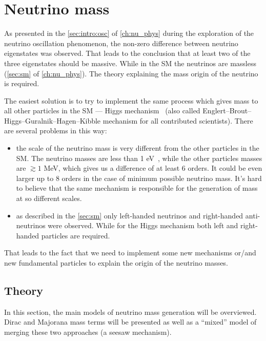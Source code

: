 \documentclass[../main.tex]{subfiles}
\begin{document}
\chapter{Neutrino mass}
\label{ch:intro:HNL}

As presented in the \autoref{sec:intro:osc} of \autoref{ch:nu_phys} during the exploration of the neutrino oscillation phenomenon, the non-zero difference between neutrino eigenstates was observed. That leads to the conclusion that at least two of the three eigenstates should be massive. While in the SM the neutrinos are massless (\autoref{sec:sm} of  \autoref{ch:nu_phys}). The theory explaining the mass origin of the neutrino is required.

The easiest solution is to try to implement the same process which gives mass to all other particles in the SM --- Higgs mechanism~\cite{Higgs1964} (also called Englert–Brout–Higgs–Guralnik–Hagen–Kibble mechanism for all contributed scientists). There are several problems in this way:
\begin{itemize}
  \item the scale of the neutrino mass is very different from the other particles in the SM. The neutrino masses are less than 1 eV~\cite{Aker2019}, while the other particles masses are $\gtrsim 1$ MeV, which gives us a difference of at least 6 orders. It could be even larger up to 8 orders in the case of minimum possible neutrino mass. It's hard to believe that the same mechanism is responsible for the generation of mass at so different scales.
  \item as described in the \autoref{sec:sm} only left-handed neutrinos and right-handed anti-neutrinos were observed. While for the Higgs mechanism both left and right-handed particles are required.
\end{itemize}

That leads to the fact that we need to implement some new mechanisms or/and new fundamental particles to explain the origin of the neutrino masses.

\section{Theory}
In this section, the main models of neutrino mass generation will be overviewed. Dirac and Majorana mass terms will be presented as well as a ``mixed'' model of merging these two approaches (a seesaw mechanism).
\end{document}
